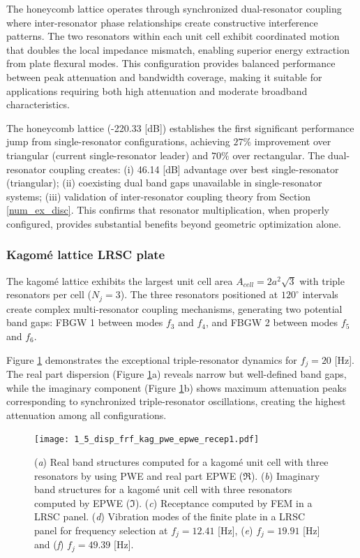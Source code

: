\documentclass[review,numbers,sort&compress]{elsarticle}
\begin{document}
The honeycomb lattice operates through synchronized dual-resonator coupling where inter-resonator phase relationships create constructive interference patterns. The two resonators within each unit cell exhibit coordinated motion that doubles the local impedance mismatch, enabling superior energy extraction from plate flexural modes. This configuration provides balanced performance between peak attenuation and bandwidth coverage, making it suitable for applications requiring both high attenuation and moderate broadband characteristics.

The honeycomb lattice (-220.33 [dB]) establishes the first significant performance jump from single-resonator configurations, achieving $27\%$ improvement over triangular (current single-resonator leader) and $70\%$ over rectangular. The dual-resonator coupling creates: (i) 46.14 [dB] advantage over best single-resonator (triangular); (ii) coexisting dual band gaps unavailable in single-resonator systems; (iii) validation of inter-resonator coupling theory from Section \ref{num_ex_disc}. This confirms that resonator multiplication, when properly configured, provides substantial benefits beyond geometric optimization alone.

\subsubsection{Kagomé lattice LRSC plate}\label{panel_lat_k}

The kagomé lattice exhibits the largest unit cell area $A_{cell} = 2a^2\sqrt{3}$ with triple resonators per cell ($N_j = 3$). The three resonators positioned at $120^\circ$ intervals create complex multi-resonator coupling mechanisms, generating two potential band gaps: FBGW 1 between modes $f_3$ and $f_4$, and FBGW 2 between modes $f_5$ and $f_6$.

Figure \ref{lat_k_pwe_epwe_tr_frf} demonstrates the exceptional triple-resonator dynamics for $f_j = 20$ [Hz]. The real part dispersion (Figure \ref{lat_k_pwe_epwe_tr_frf}a) reveals narrow but well-defined band gaps, while the imaginary component (Figure \ref{lat_k_pwe_epwe_tr_frf}b) shows maximum attenuation peaks corresponding to synchronized triple-resonator oscillations, creating the highest attenuation among all configurations.

\begin{figure}[htb]
	\centering
	\texttt{[image: 1\_5\_disp\_frf\_kag\_pwe\_epwe\_recep1.pdf]}
	\caption{(\textit{a}) Real band structures computed for a kagomé unit cell with three resonators by using PWE and real part EPWE ($\Re$). (\textit{b}) Imaginary band structures for a kagomé unit cell with three resonators computed by EPWE ($\Im$). (\textit{c}) Receptance computed by FEM in a LRSC panel. (\textit{d}) Vibration modes of the finite plate in a LRSC panel for frequency selection at $f_j = 12.41$ [Hz], (\textit{e}) $f_j = 19.91$ [Hz] and (\textit{f}) $f_j = 49.39$ [Hz].}
	\label{lat_k_pwe_epwe_tr_frf}
\end{figure}
\end{document}
